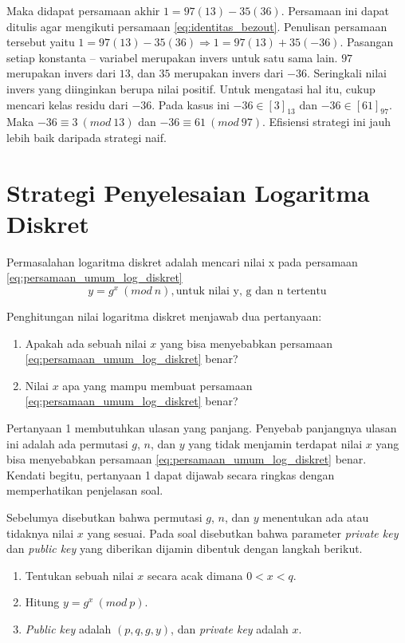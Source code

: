 Maka didapat persamaan akhir $ 1=97(13)-35(36) $. Persamaan ini dapat ditulis agar mengikuti persamaan \eqref{eq:identitas_bezout}. Penulisan persamaan tersebut yaitu $ 1=97(13)-35(36) \Rightarrow 1=97(13)+35(-36) $. Pasangan setiap konstanta -- variabel merupakan invers untuk satu sama lain. $ 97 $ merupakan invers dari $ 13 $, dan $ 35 $ merupakan invers dari $ -36 $. Seringkali nilai invers yang diinginkan berupa nilai positif. Untuk mengatasi hal itu, cukup mencari kelas residu dari $ -36 $. Pada kasus ini $ -36\in[3]_{13}$ dan $ -36\in[61]_{97} $. Maka $ -36\equiv3\ (mod\ 13) $ dan $ -36\equiv61\ (mod\ 97) $.
Efisiensi strategi ini jauh lebih baik daripada strategi naif.

\section{Strategi Penyelesaian Logaritma Diskret}

Permasalahan logaritma diskret adalah mencari nilai x pada persamaan \eqref{eq:persamaan_umum_log_diskret}
\[
y = g^{x}\ (mod\ n),\text{untuk nilai y, g dan n tertentu}
\]

Penghitungan nilai logaritma diskret menjawab dua pertanyaan:
\begin{enumerate}
\item Apakah ada sebuah nilai $ x $ yang bisa menyebabkan persamaan \eqref{eq:persamaan_umum_log_diskret} benar?
\item Nilai $ x $ apa yang mampu membuat persamaan \eqref{eq:persamaan_umum_log_diskret} benar?
\end{enumerate}

Pertanyaan 1 membutuhkan ulasan yang panjang. Penyebab panjangnya ulasan ini adalah ada permutasi $ g $, $ n $, dan $ y $ yang tidak menjamin terdapat nilai $ x $ yang bisa menyebabkan persamaan \eqref{eq:persamaan_umum_log_diskret} benar. Kendati begitu, pertanyaan 1 dapat dijawab secara ringkas dengan memperhatikan penjelasan soal. 

Sebelumya disebutkan bahwa permutasi $ g $, $ n $, dan $ y $ menentukan ada atau tidaknya nilai $ x $ yang sesuai. Pada soal disebutkan bahwa parameter \textit{private key} dan \textit{public key} yang diberikan dijamin dibentuk dengan langkah berikut.

\begin{enumerate}
\item Tentukan sebuah nilai $ x $ secara acak dimana $ 0 < x < q $.
\item Hitung $ y = g^x\ (mod\ p) $.
\item \textit{Public key} adalah $ (p, q, g, y) $, dan \textit{private key} adalah $ x $.
\end{enumerate}

